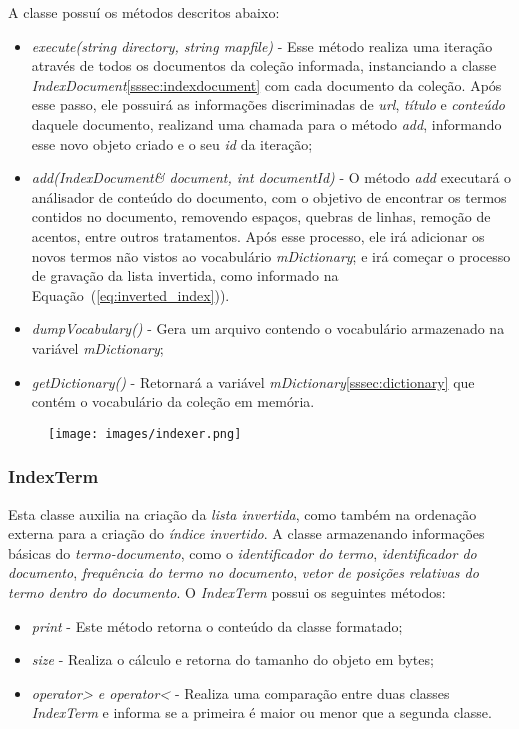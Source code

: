 \documentclass[12pt]{article}
\begin{document}
A classe possuí os métodos descritos abaixo:
\begin{itemize}
\item \textit{execute(string directory, string mapfile)} - Esse método realiza uma iteração através de todos os documentos da coleção informada, instanciando a classe \textit{IndexDocument}\ref{sssec:indexdocument} com cada documento da coleção. Após esse passo, ele possuirá as informações discriminadas de \textit{url}, \textit{título} e \textit{conteúdo} daquele documento, realizand uma chamada para o método \textit{add}, informando esse novo objeto criado e o seu \textit{id} da iteração;
\item \textit{add(IndexDocument\& document, int documentId)} - O método \textit{add} executará o análisador de conteúdo do documento, com o objetivo de encontrar os termos contidos no documento, removendo espaços, quebras de linhas, remoção de acentos, entre outros tratamentos. Após esse processo, ele irá adicionar os novos termos não vistos ao vocabulário \textit{mDictionary}; e irá começar o processo de gravação da lista invertida, como informado na Equação~(\ref{eq:inverted_index})).
\item \textit{dumpVocabulary()} - Gera um arquivo contendo o vocabulário armazenado na variável \textit{mDictionary};
\item \textit{getDictionary()} - Retornará a variável \textit{mDictionary}\ref{sssec:dictionary} que contém o vocabulário da coleção em memória.
\end{itemize}

\begin{figure}[ht]
\centering
\texttt{[image: images/indexer.png]}
\label{fig:indexer}
\end{figure}

\subsubsection{IndexTerm} \label{sssec:indexterm}

Esta classe auxilia na criação da \textit{lista invertida}, como também na ordenação externa para a criação do \textit{índice invertido}. A classe armazenando informações básicas do \textit{termo-documento}, como o \textit{identificador do termo}, \textit{identificador do documento}, \textit{frequência do termo no documento}, \textit{vetor de posições relativas do termo dentro do documento}. O \textit{IndexTerm} possui os seguintes métodos:
\begin{itemize}
\item \textit{print} - Este método retorna o conteúdo da classe formatado;
\item \textit{size} - Realiza o cálculo e retorna do tamanho do objeto em bytes;
\item \textit{operator> e operator<} - Realiza uma comparação entre duas classes \textit{IndexTerm} e informa se a primeira é maior ou menor que a segunda classe.
\end{itemize}
\end{document}
